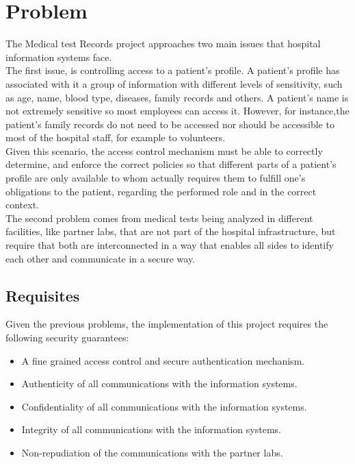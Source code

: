 \section{Problem}

The Medical test Records project approaches two main issues that hospital information systems face. \\

The first issue, is controlling access to a patient's profile.
A patient's profile has associated with it a group of information with different levels of sensitivity, such as age, name, blood type, diseases, family records and others.
A patient's name is not extremely sensitive so most employees can access it. However, for instance,the patient's family records do not need to be accessed nor should be accessible to most of the hospital staff, for example to volunteers. \\

Given this scenario, the access control mechanism must be able to correctly determine, and enforce the correct policies so that different parts of a patient's profile are only available to whom actually requires them to fulfill one's obligations to the patient, regarding the performed role and in the correct context. \\

The second problem comes from medical tests being analyzed in different facilities, like partner labs, that are not part of the hospital infrastructure, but require that both are interconnected in a way that enables all sides to identify each other and communicate in a secure way. \\

\subsection{Requisites}

Given the previous problems, the implementation of this project requires the following security guarantees:
\begin{itemize}
	\item A fine grained access control and secure authentication mechanism.
	\item Authenticity of all communications with the information systems.
	\item Confidentiality of all communications with the information systems.
	\item Integrity of all communications with the information systems.
	\item Non-repudiation of the communications with the partner labs.
\end{itemize}


